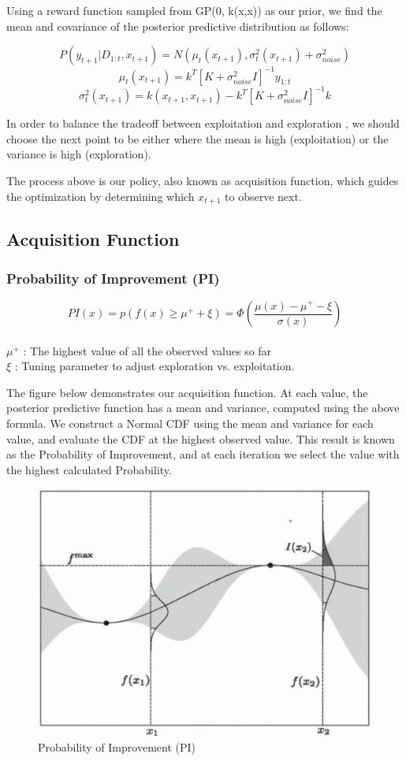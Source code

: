 \documentclass{article}
\begin{document}
Using a reward function sampled from GP(0, k(x,x)) as our prior, we find the mean and covariance of the posterior predictive distribution as follows:

$$P(y_{t+1} | D_{1:t}, x_{t+1}) = N(\mu_t(x_{t+1}), \sigma_t^2(x_{t+1}) + \sigma_{noise}^2)$$
$$\mu_t(x_{t+1}) = k^T[K + \sigma_{noise}^2I]^{-1}y_{1:t}$$
$$\sigma_t^2(x_{t+1}) = k(x_{t+1}, x_{t+1}) - k^T[K + \sigma_{noise}^2I]^{-1}k$$

In order to balance the tradeoff between exploitation and exploration , we should choose the next point to be either where the mean is high (exploitation) or the variance is high (exploration).

The process above is our policy, also known as acquisition function, which guides the optimization by determining which $x_{t+1}$ to observe next.

\subsection{Acquisition Function}

\subsubsection{Probability of Improvement (PI)}

$$PI(x) = p(f(x) \geq \mu^+ + \xi) = \Phi(\frac{\mu(x) - \mu^+ - \xi}{\sigma(x)})$$\\
$\mu^+$ : The highest value of all the observed values so far\\
$\xi$ : Tuning parameter to adjust exploration vs. exploitation. 

The figure below demonstrates our acquisition function. At each value, the posterior predictive function has a mean and variance, computed using the above formula. We construct a Normal CDF using the mean and variance for each value, and evaluate the CDF at the highest observed value. This result is known as the Probability of Improvement, and at each iteration we select the value with the highest calculated Probability.

\begin{figure}[H]
\centering
\includegraphics[scale=0.4]{Prob_Improvement.png}
\caption{Probability of Improvement (PI)}
\end{figure}
\end{document}
